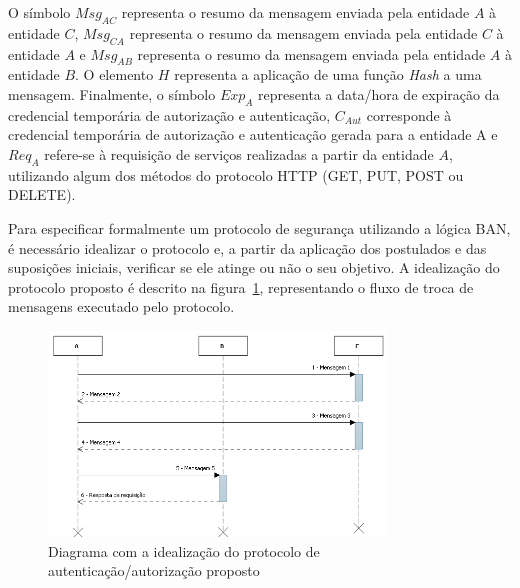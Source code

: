 O símbolo ${Msg_{AC}}$ representa o resumo da mensagem enviada pela entidade ${A}$ à entidade ${C}$, ${Msg_{CA}}$ representa o resumo da mensagem enviada pela entidade ${C}$ à entidade ${A}$ e ${Msg_{AB}}$ representa o resumo da mensagem enviada pela entidade ${A}$ à entidade ${B}$. O elemento ${H}$ representa a aplicação de uma função \emph{Hash} a uma mensagem.
Finalmente, o símbolo ${Exp_A}$ representa a data/hora  de expiração da credencial temporária de autorização e autenticação, ${C_{Aut}}$ corresponde à credencial temporária de autorização e autenticação gerada para a entidade A e ${Req_A}$ refere-se à requisição de serviços realizadas a partir da entidade $A$, utilizando algum dos métodos do protocolo HTTP (GET, PUT, POST ou DELETE).

Para especificar formalmente um protocolo de segurança utilizando a lógica BAN, é necessário idealizar o protocolo e, a partir da aplicação dos postulados e das suposições iniciais, verificar se ele atinge ou não o seu objetivo. A idealização do protocolo proposto é descrito na figura~\ref{fig:protocoidealizado}, representando o fluxo de troca de mensagens executado pelo protocolo. %

\begin{figure}[!htb]
    \centering
    \includegraphics[width=0.8\textwidth]{fluxo_autenticacao_BAN.png}
    \caption{Diagrama com a idealização do protocolo de autenticação/autorização proposto}
    \label{fig:protocoidealizado}
\end{figure}

